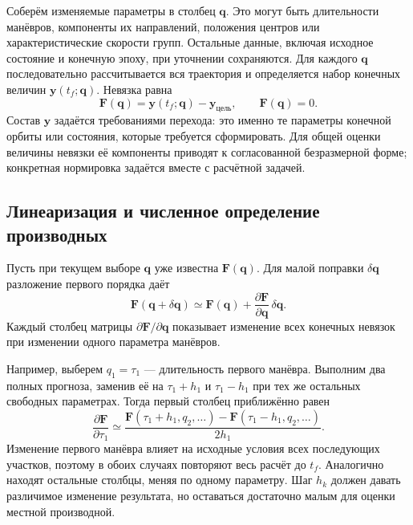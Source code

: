 \documentclass[a4paper,11pt]{article}
\newcommand{\vect}[1]{\boldsymbol{#1}}
\numberwithin{equation}{section}
\begin{document}
Соберём изменяемые параметры в столбец $\vect q$.
Это могут быть длительности манёвров, компоненты их направлений,
положения центров или характеристические скорости групп.
Остальные данные, включая исходное состояние и конечную эпоху,
при уточнении сохраняются.
Для каждого $\vect q$ последовательно рассчитывается вся траектория
и определяется набор конечных величин $\vect y(t_f;\vect q)$.
Невязка равна
\begin{equation}
\vect F(\vect q)=\vect y(t_f;\vect q)-\vect y_{\text{цель}},
\qquad \vect F(\vect q)=0.
\label{eq:residual}
\end{equation}
Состав $\vect y$ задаётся требованиями перехода:
это именно те параметры конечной орбиты или состояния,
которые требуется сформировать.
Для общей оценки величины невязки её компоненты приводят
к согласованной безразмерной форме; конкретная нормировка
задаётся вместе с расчётной задачей.

\subsection{Линеаризация и численное определение производных}

Пусть при текущем выборе $\vect q$ уже известна $\vect F(\vect q)$.
Для малой поправки $\delta\vect q$ разложение первого порядка даёт
\begin{equation}
\vect F(\vect q+\delta\vect q)
\simeq\vect F(\vect q)
 +\frac{\partial\vect F}{\partial\vect q}\,\delta\vect q.
\label{eq:linearize}
\end{equation}
Каждый столбец матрицы $\partial\vect F/\partial\vect q$
показывает изменение всех конечных невязок при изменении
одного параметра манёвров.

Например, выберем $q_1=\tau_1$ --- длительность первого манёвра.
Выполним два полных прогноза, заменив её на $\tau_1+h_1$
и $\tau_1-h_1$ при тех же остальных свободных параметрах.
Тогда первый столбец приближённо равен
\begin{equation}
\frac{\partial\vect F}{\partial\tau_1}
\simeq
\frac{\vect F(\tau_1+h_1,q_2,\ldots)
      -\vect F(\tau_1-h_1,q_2,\ldots)}{2h_1}.
\label{eq:central-difference}
\end{equation}
Изменение первого манёвра влияет на исходные условия всех
последующих участков, поэтому в обоих случаях повторяют
весь расчёт до $t_f$.
Аналогично находят остальные столбцы, меняя по одному параметру.
Шаг $h_k$ должен давать различимое изменение результата,
но оставаться достаточно малым для оценки местной производной.
\end{document}

